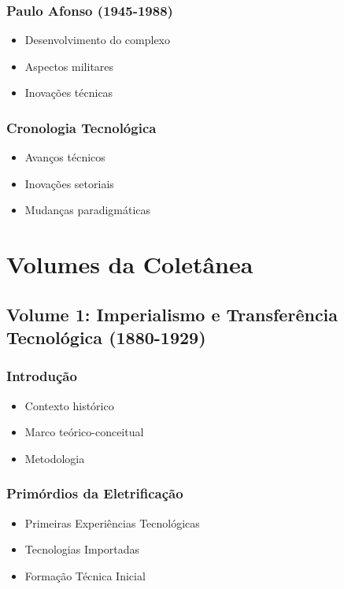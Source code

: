 \documentclass[12pt,a4paper]{report}
\begin{document}
\section{Paulo Afonso (1945-1988)}
\begin{itemize}[leftmargin=*]
    \item Desenvolvimento do complexo
    \item Aspectos militares
    \item Inovações técnicas
\end{itemize}

\section{Cronologia Tecnológica}
\begin{itemize}[leftmargin=*]
    \item Avanços técnicos
    \item Inovações setoriais
    \item Mudanças paradigmáticas
\end{itemize}

\part{Volumes da Coletânea}

\chapter{Volume 1: Imperialismo e Transferência Tecnológica (1880-1929)}

\section{Introdução}
\begin{itemize}[leftmargin=*]
    \item Contexto histórico
    \item Marco teórico-conceitual
    \item Metodologia
\end{itemize}

\section{Primórdios da Eletrificação}
\begin{itemize}[leftmargin=*]
    \item Primeiras Experiências Tecnológicas
    \item Tecnologias Importadas
    \item Formação Técnica Inicial
\end{itemize}
\end{document}
